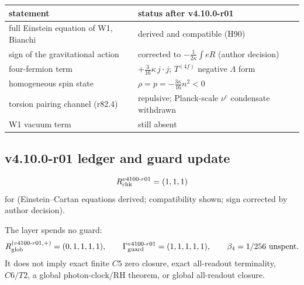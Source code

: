 \begin{center}
\small
\begin{tabular}{@{}>{\raggedright\arraybackslash}p{}>{\raggedright\arraybackslash}p{}@{}}
\toprule
statement & status after v4.10.0-r01\\
\midrule
full Einstein equation of W1, Bianchi & derived and compatible (H90)\\
sign of the gravitational action & corrected to \(-\tfrac1{2\kappa}\int eR\) (author decision)\\
four-fermion term & \(+\tfrac3{16}\kappa\,j\cdot j\); \(T^{(4f)}\) negative \(\Lambda\) form\\
homogeneous spin state & \(\rho=p=-\tfrac{3\kappa}{16}n^2<0\)\\
torsion pairing channel (r82.4) & repulsive; Planck-scale \(\nu^c\) condensate withdrawn\\
W1 vacuum term & still absent\\
\bottomrule
\end{tabular}
\end{center}

\subsection*{v4.10.0-r01 ledger and guard update}
\label{subsec:v4100-r01-ledger-guard}

\[
R_{\rm chk}^{v4100\text{-}r01}=(1,1,1)
\]
for (Einstein--Cartan equations derived; compatibility shown; sign corrected by author decision).

The layer spends no guard:
\[
R_{\rm glob}^{(v4100\text{-}r01,+)}=(0,1,1,1,1),
\qquad
\Gamma_{\rm guard}^{v4100\text{-}r01}=(1,1,1,1,1),
\qquad
\beta_4=1/256\ \text{unspent}.
\]
It does not imply exact finite \(C5\) zero closure, exact all-readout terminality,
\(C6/T2\), a global photon-clock/RH theorem, or global all-readout closure.
